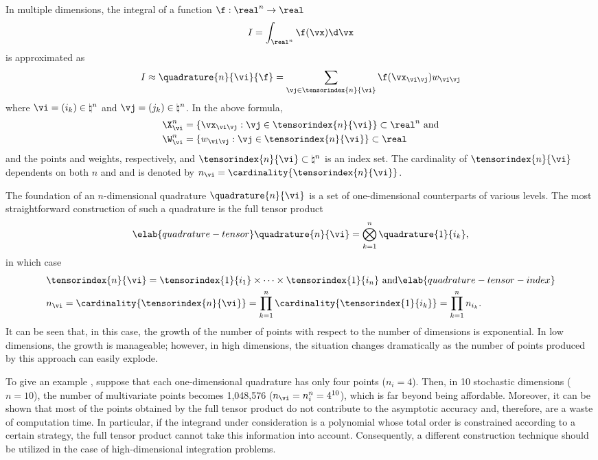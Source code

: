 In multiple dimensions, the integral of a function $\f: \real^n \to \real$
\[
  I = \int_{\real^n} \f(\vx) \d \vx
\]
is approximated as
\[
  I \approx \quadrature{n}{\vi}{\f}
  = \sum_{\vj \in \tensorindex{n}{\vi}} \f(\vx_{\vi \vj}) w_{\vi \vj}
\]
where $\vi = (i_k) \in \natural^n$ and $\vj = (j_k) \in \natural^n$. In the
above formula,
\begin{align*}
  & \X^n_{\vi} = \{ \vx_{\vi \vj}: \vj \in \tensorindex{n}{\vi} \} \subset \real^n \text{ and} \\
  & \W^n_{\vi} = \{ w_{\vi \vj}: \vj \in \tensorindex{n}{\vi} \} \subset \real
\end{align*}
and the points and weights, respectively, and $\tensorindex{n}{\vi} \subset
\natural^n$ is an index set. The cardinality of $\tensorindex{n}{\vi}$
dependents on both $n$ and \vi and is denoted by $n_{\vi} =
\cardinality{\tensorindex{n}{\vi}}$.

The foundation of an $n$-dimensional quadrature $\quadrature{n}{\vi}$ is a set
of one-dimensional counterparts of various levels. The most straightforward
construction of such a quadrature is the full tensor product
\begin{equation} \elab{quadrature-tensor}
  \quadrature{n}{\vi} = \bigotimes_{k = 1}^n \quadrature{1}{i_k},
\end{equation}
in which case
\begin{align}
  & \tensorindex{n}{\vi}
  = \tensorindex{1}{i_1} \times \cdots \times \tensorindex{1}{i_n} \text{ and} \elab{quadrature-tensor-index} \\
  & n_{\vi}
  = \cardinality{\tensorindex{n}{\vi}}
  = \prod_{k = 1}^n \cardinality{\tensorindex{1}{i_k}}
  = \prod_{k = 1}^n n_{i_k}. \nonumber
\end{align}
It can be seen that, in this case, the growth of the number of points with
respect to the number of dimensions is exponential. In low dimensions, the
growth is manageable; however, in high dimensions, the situation changes
dramatically as the number of points produced by this approach can easily
explode.

To give an example \cite{heiss2008}, suppose that each one-dimensional
quadrature has only four points ($n_i = 4$). Then, in 10 stochastic dimensions
($n = 10$), the number of multivariate points becomes 1,048,576 ($n_{\vi} =
n_i^n = 4^{10}$), which is far beyond being affordable. Moreover, it can be
shown that most of the points obtained by the full tensor product do not
contribute to the asymptotic accuracy and, therefore, are a waste of computation
time. In particular, if the integrand under consideration is a polynomial whose
total order is constrained according to a certain strategy, the full tensor
product cannot take this information into account. Consequently, a different
construction technique should be utilized in the case of high-dimensional
integration problems.

